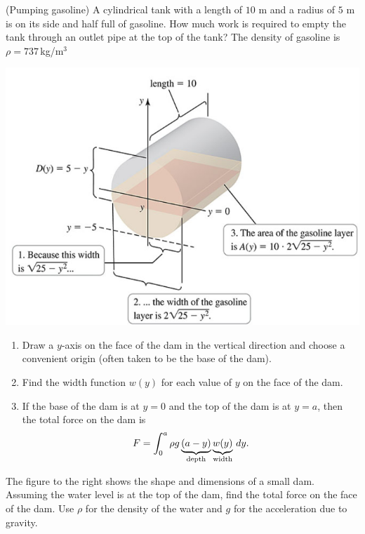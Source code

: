 \documentclass[../mathNotesPreamble]{subfiles}
\begin{document}
  \begin{ex*}(Pumping gasoline)
    A cylindrical tank with a length of $10$ m and a radius of $5$ m is on its side and half full of gasoline. How much work is required to empty the tank through an outlet pipe at the top of the tank? The density of gasoline is $\rho=737$\,kg/m$^3$
  \end{ex*}
  \begin{flushright}
    \includegraphics[width=0.45\linewidth]{../images/briggs_06_07/fig06_78}
  \end{flushright}
  \pagebreak

  \begin{thmBox*}
    \begin{enumerate}
      \item 
        Draw a $y$-axis on the face of the dam in the vertical direction and choose a convenient origin (often taken to be the base of the dam).
      \item 
        Find the width function $w(y)$ for each value of $y$ on the face of the dam.
      \item 
        If the base of the dam is at $y=0$ and the top of the dam is at $y=a$, then the total force on the dam is
          \[F=\int_0^a \rho g\underbrace{(a-y)}_{\textnormal{depth}}\underbrace{w(y)}_{\textnormal{width}}\,dy.\]
    \end{enumerate}
  \end{thmBox*}

  \begin{ex*}
    The figure to the right shows the shape and dimensions of a small dam. Assuming the water level is at the top of the dam, find the total force on the face of the dam. Use $\rho$ for the density of the water and $g$ for the acceleration due to gravity.
  \end{ex*}
  \begin{flushright}
  \end{flushright}
  \pagebreak
\end{document}
